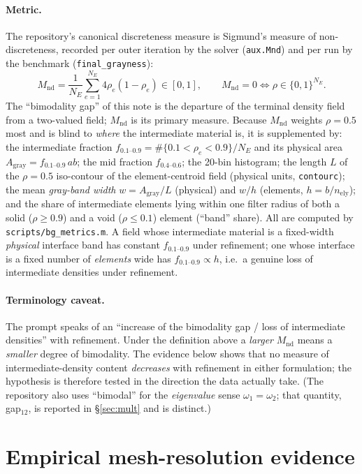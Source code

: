 \documentclass[10pt,a4paper]{article}
\newcommand{\Mnd}{M_{\mathrm{nd}}}
\newcommand{\fgray}{f_{0.1\text{--}0.9}}
\newcommand{\code}[1]{\texttt{\small #1}}
\begin{document}
\paragraph{Metric.} The repository's canonical discreteness measure is Sigmund's measure of non-discreteness, recorded per outer iteration by the solver (\code{aux.Mnd}) and per run by the benchmark (\code{final\_grayness}):
\begin{equation}
\Mnd=\frac{1}{N_E}\sum_{e=1}^{N_E}4\rho_e(1-\rho_e)\in[0,1],\qquad \Mnd=0 \iff \rho\in\{0,1\}^{N_E}.
\end{equation}
The ``bimodality gap'' of this note is the departure of the terminal density field from a two-valued field; $\Mnd$ is its primary measure. Because $\Mnd$ weights $\rho=0.5$ most and is blind to \emph{where} the intermediate material is, it is supplemented by: the intermediate fraction $\fgray=\#\{0.1<\rho_e<0.9\}/N_E$ and its physical area $A_{\mathrm{gray}}=\fgray\,ab$; the mid fraction $f_{0.4\text{--}0.6}$; the 20-bin histogram; the length $L$ of the $\rho=0.5$ iso-contour of the element-centroid field (physical units, \code{contourc}); the mean \emph{gray-band width} $w=A_{\mathrm{gray}}/L$ (physical) and $w/h$ (elements, $h=b/n_{\mathrm{ely}}$); and the share of intermediate elements lying within one filter radius of both a solid ($\rho\ge0.9$) and a void ($\rho\le0.1$) element (``band'' share). All are computed by \code{scripts/bg\_metrics.m}. A field whose intermediate material is a fixed-width \emph{physical} interface band has constant $\fgray$ under refinement; one whose interface is a fixed number of \emph{elements} wide has $\fgray\propto h$, i.e.\ a genuine loss of intermediate densities under refinement.

\paragraph{Terminology caveat.} The prompt speaks of an ``increase of the bimodality gap / loss of intermediate densities'' with refinement. Under the definition above a \emph{larger} $\Mnd$ means a \emph{smaller} degree of bimodality. The evidence below shows that no measure of intermediate-density content \emph{decreases} with refinement in either formulation; the hypothesis is therefore tested in the direction the data actually take. (The repository also uses ``bimodal'' for the \emph{eigenvalue} sense $\omega_1=\omega_2$; that quantity, gap$_{12}$, is reported in \S\ref{sec:mult} and is distinct.)

\section{Empirical mesh-resolution evidence}\label{sec:emp}
\end{document}
